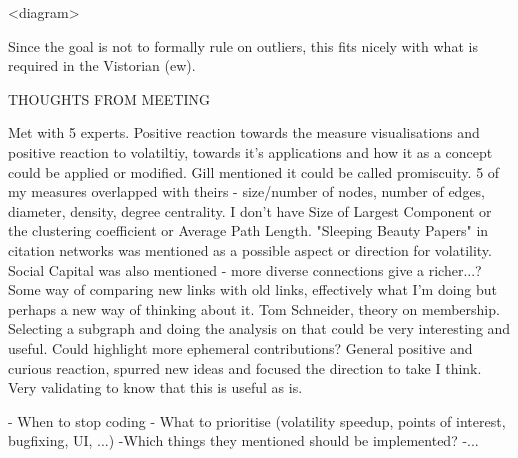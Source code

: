 <diagram>


Since the goal is not to formally rule on outliers, this fits nicely with what is required in the Vistorian (ew).



THOUGHTS FROM MEETING

Met with 5 experts. Positive reaction towards the measure visualisations and positive reaction to volatiltiy, towards it's applications and how it as a concept could be applied or modified.
Gill mentioned it could be called promiscuity.
5 of my measures overlapped with theirs - size/number of nodes, number of edges, diameter, density, degree centrality. I don't have Size of Largest Component or the clustering coefficient or Average Path Length. "Sleeping Beauty Papers" in citation networks was mentioned as a possible aspect or direction for volatility. Social Capital was also mentioned - more diverse connections give a richer...? Some way of comparing new links with old links, effectively what I'm doing but perhaps a new way of thinking about it. Tom Schneider, theory on membership. Selecting a subgraph and doing the analysis on that could be very interesting and useful. Could highlight more ephemeral contributions? 
General positive and curious reaction, spurred new ideas and focused the direction to take I think. Very validating to know that this is useful as is. 

- When to stop coding
- What to prioritise (volatility speedup, points of interest, bugfixing, UI, ...)
-Which things they mentioned should be implemented?
-...